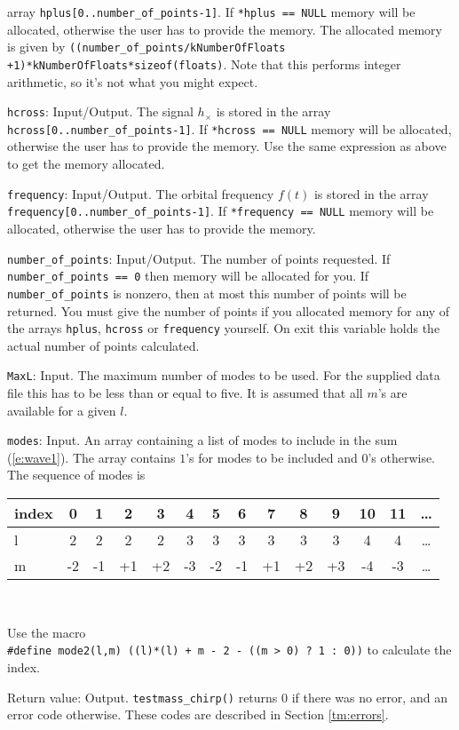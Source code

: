 \begin{description}
    array {\tt *hplus[0..number\_of\_points-1]}. If {\tt **hplus == NULL}
	memory will be allocated, otherwise the user has to provide the memory.
	The allocated memory is given by {\tt ((number\_of\_points/kNumberOfFloats
	+1)*kNumberOfFloats*sizeof(floats)}. Note that this performs integer
	arithmetic, so it's not what you might expect.
\item{{\tt hcross}}: Input/Output. The signal $h_\times$ is stored in the
    array {\tt *hcross[0..number\_of\_points-1]}. If {\tt **hcross == NULL}
	memory will be allocated, otherwise the user has to provide the memory.
	Use the same expression as above to get the memory allocated.
\item{{\tt frequency}}: Input/Output. The orbital frequency $f(t)$ is stored in
    the array {\tt *frequency[0..number\_of\_points-1]}. If {\tt **frequency == NULL}
	memory will be allocated, otherwise the user has to provide the memory.
\item{{\tt number\_of\_points}}: Input/Output. The number of points requested.
   If {\tt number\_of\_points == 0} then memory will be allocated for you.
   If {\tt number\_of\_points} is nonzero, then at most this number of points will 
   be returned. You must give the number of points if you allocated memory for
   any of the arrays {\tt hplus}, {\tt hcross} or {\tt frequency}
   yourself. On exit this variable holds the actual number of points calculated.  
\item{{\tt MaxL}}: Input. The maximum number of modes to be used. For the
supplied data file this has to be less than or equal to five. It is assumed that all
$m$'s are available for a given $l$. 
\item{{\tt modes}}: Input. An array containing a list of  modes to include in the
sum (\ref{e:wave1}). The array contains $1$'s for modes to be included
and $0$'s otherwise. The sequence of modes is \\
\begin{center}
\begin{tabular}{|l|ccccccccccccc|}
\hline
index &  0 &  1 &  2  & 3 & 4  &  5 &  6 &  7 &  8 &  9 & 10 & 11 &\ldots \\ \hline
l     &  2 &  2 &  2 &  2 & 3  &  3 &  3 &  3 &  3 &  3 & 4  & 4 & \ldots \\ \hline
m     & -2 & -1 & +1 & +2 & -3 & -2 & -1 & +1 & +2 & +3 & -4 & -3 &\ldots \\ \hline
\end{tabular}\\
\end{center}
Use the macro \\
{\tt \#define mode2(l,m)  ((l)*(l) + m - 2 - ((m > 0) ? 1 : 0))}
to calculate the index.

\item{Return value}: Output. {\tt testmass\_chirp()} returns $0$ if there was
   no error, and an error code otherwise. These codes are described in Section \ref{tm:errors}.
\end{description}
				      
